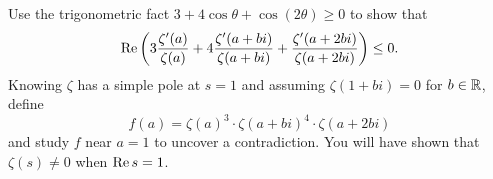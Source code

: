 \documentclass{homework}
\begin{document}
                                                                                                      \begin{problem}
                                                                                                        Use the trigonometric fact $3 + 4 \cos \theta + \cos (2\theta) \geq 0$ to show that
                                                                                                          \[
                                                                                                              \operatorname{Re} \left( 3 \frac{ \zeta'(a) }{ \zeta(a) } + 4 \frac{ \zeta'(a+bi) }{ \zeta(a+bi) } +  \frac{ \zeta'(a+2bi) }{ \zeta(a+2bi) } \right) \leq 0.
                                                                                                                \]
                                                                                                                  Knowing $\zeta$ has a simple pole at $s = 1$ and assuming
                                                                                                                    $\zeta(1+bi) = 0$ for $b \in \mathbb{R}$, define 
                                                                                                                      \[
                                                                                                                          f(a) = \zeta(a)^3 \cdot \zeta(a+bi)^4 \cdot \zeta(a + 2bi)
                                                                                                                            \]
                                                                                                                              and study $f$ near $a = 1$ to uncover a contradiction.  You will
                                                                                                                                have shown that $\zeta(s) \neq 0$ when $\operatorname{Re} s = 1$.
                                                                                                                                \end{problem}
\end{document}
